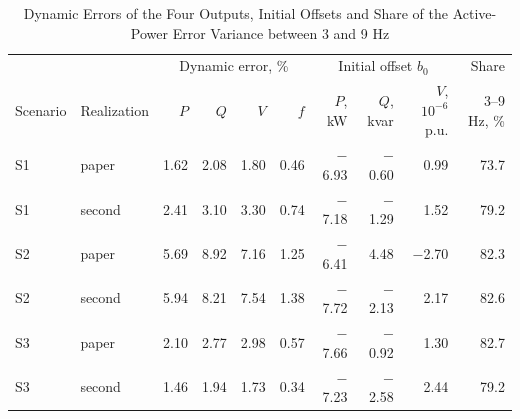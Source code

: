 \begin{table}[H]
\centering\small\setlength{\tabcolsep}{4.5pt}
\caption{Dynamic Errors of the Four Outputs, Initial Offsets and Share of the Active-Power Error Variance between 3 and 9 Hz}
\label{tab:dynamic}
\begin{tabular}{llrrrrrrrr}\toprule
 & & \multicolumn{4}{c}{Dynamic error, \%} & \multicolumn{3}{c}{Initial offset $b_0$} & Share\\
Scenario & Realization & $P$ & $Q$ & $V$ & $f$ & $P$, kW & $Q$, kvar & $V$, $10^{-6}$ p.u. & 3--9 Hz, \%\\\midrule
S1 & paper & 1.62 & 2.08 & 1.80 & 0.46 & $-$6.93 & $-$0.60 & 0.99 & 73.7 \\
S1 & second & 2.41 & 3.10 & 3.30 & 0.74 & $-$7.18 & $-$1.29 & 1.52 & 79.2 \\
S2 & paper & 5.69 & 8.92 & 7.16 & 1.25 & $-$6.41 & 4.48 & $-$2.70 & 82.3 \\
S2 & second & 5.94 & 8.21 & 7.54 & 1.38 & $-$7.72 & $-$2.13 & 2.17 & 82.6 \\
S3 & paper & 2.10 & 2.77 & 2.98 & 0.57 & $-$7.66 & $-$0.92 & 1.30 & 82.7 \\
S3 & second & 1.46 & 1.94 & 1.73 & 0.34 & $-$7.23 & $-$2.58 & 2.44 & 79.2 \\
\bottomrule\end{tabular}\end{table}
